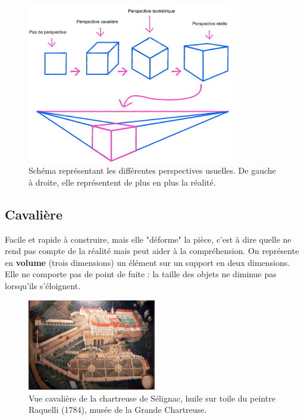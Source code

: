 \documentclass[
	11pt, %
	fleqn, %
	a4paper, %
]{LegrandOrangeBook}
\begin{document}
\begin{figure}[H] %
	\centering %
	\includegraphics[width=0.8\textwidth]{Images/pers.jpg} %
	\caption{Schéma représentant les différentes perspectives usuelles. De gauche à droite, elle représentent de plus en plus la réalité.}
	\label{pers} %
\end{figure}


\subsection{Cavalière}
Facile et rapide à construire, mais elle "déforme" la pièce, c'est à dire quelle ne rend pas compte de la réalité mais peut aider à la compréhension. On représente en \textbf{volume} (trois dimensions) un élément sur un support en deux dimensions. Elle ne comporte pas de point de fuite : la taille des objets ne diminue pas lorsqu'ils s'éloignent.

\begin{figure}[H] %
	\centering %
	\includegraphics[width=0.5\textwidth]{Images/musee.jpg} %
	\caption{Vue cavalière de la chartreuse de Sélignac, huile sur toile du peintre Raquelli (1784), musée de la Grande Chartreuse.}
	\label{musee} %
\end{figure}
\end{document}
